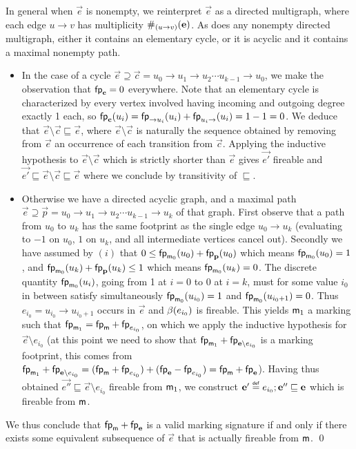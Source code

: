 \begin{proofE}
  In general when $\vec{e}$ is nonempty, we reinterpret $\vec{e}$ as a
  directed multigraph, where each edge $u \to v$ has multiplicity
  $\#_{(u \to v)}(\mathbf{e})$.  As does any nonempty directed
  multigraph, either it contains an elementary cycle, or it is acyclic and it
  contains a maximal nonempty path.
  \begin{itemize}
    \item In the case of a cycle $\vec{e} \supseteq \vec{c} = u_0 \to
      u_1 \to u_2 \cdots u_{k-1} \to u_0$, we make the observation
      that $\mathsf{fp}_{\mathbf{c}} = 0$ everywhere. Note that an elementary
      cycle is characterized by every vertex involved having incoming
      and outgoing degree exactly 1 each, so $\mathsf{fp}_{\mathbf{c}}(u_i) =
      \mathsf{fp}_{\to u_i}(u_i) + \mathsf{fp}_{u_i \to}(u_i) = 1 - 1 = 0$.  We
      deduce that $\vec{e} \setminus \vec{c} \sqsubseteq \vec{e}$,
      where $\vec{e} \setminus \vec{c}$ is naturally the sequence
      obtained by removing from $\vec{e}$ an occurrence of each
      transition from $\vec{c}$. Applying the inductive hypothesis to
      $\vec{e} \setminus \vec{c}$ which is strictly shorter than
      $\vec{e}$ gives $\vec{e'}$ fireable and $\vec{e'} \sqsubseteq
      \vec{e} \setminus \vec{c} \sqsubseteq \vec{e}$ where we conclude
      by transitivity of $\sqsubseteq$.
    \item Otherwise we have a directed acyclic graph,
      and a maximal path $\vec{e} \supseteq \vec{p} = u_0 \to u_1 \to u_2 \cdots u_{k-1} \to u_k$
      of that graph.
      First observe that a path from $u_0$ to $u_k$ has the same footprint
      as the single edge $u_0 \to u_k$ (evaluating to $-1$ on $u_0$, $1$ on $u_k$,
      and all intermediate vertices cancel out).
      Secondly we have assumed by $(i)$ that
      $0 \leq \mathsf{fp}_{\mathsf{m}_0}(u_0) + \mathsf{fp}_{\mathbf{p}}(u_0)$ which means $\mathsf{fp}_{\mathsf{m}_0}(u_0) = 1$,
      and $\mathsf{fp}_{\mathsf{m}_0}(u_k) + \mathsf{fp}_{\mathbf{p}}(u_k) \leq 1$ which means $\mathsf{fp}_{\mathsf{m}_0}(u_k) = 0$.
      The discrete quantity $\mathsf{fp}_{\mathsf{m}_0}(u_i)$,
      going from 1 at $i=0$ to 0 at $i=k$,
      must for some value $i_0$ in between satisfy simultaneously
      $\mathsf{fp}_{\mathsf{m}_0}(u_{i_0}) = 1$ and $\mathsf{fp}_{\mathsf{m}_0}(u_{i_0+1}) = 0$.
      Thus $e_{i_0} = u_{i_0} \to u_{i_0+1}$ occurs in $\vec{e}$ and $\beta(e_{i_0})$ is fireable.
      This yields $\mathsf{m}_1$ a marking such that $\mathsf{fp}_{\mathsf{m}_1} = \mathsf{fp}_{\mathsf{m}} + \mathsf{fp}_{e_{i_0}}$,
      on which we apply the inductive hypothesis for $\vec{e} \setminus e_{i_0}$
      (at this point we need to show that $\mathsf{fp}_{\mathsf{m}_1} + \mathsf{fp}_{\mathbf{e} \setminus e_{i_0}}$ is a marking footprint,
      this comes from $\mathsf{fp}_{\mathsf{m}_1} + \mathsf{fp}_{\mathbf{e} \setminus e_{i_0}} = (\mathsf{fp}_{\mathsf{m}} + \mathsf{fp}_{e_{i_0}}) + (\mathsf{fp}_{\mathbf{e}} - \mathsf{fp}_{e_{i_0}}) = \mathsf{fp}_{\mathsf{m}} + \mathsf{fp}_{\mathbf{e}}$).
      Having thus obtained $\vec{e''} \sqsubseteq \vec{e} \setminus e_{i_0}$
      fireable from $\mathsf{m}_1$,
      we construct $\mathbf{e'} \stackrel{\scriptscriptstyle{\mathsf{def}}}{=} e_{i_0}; \mathbf{e''} \sqsubseteq \mathbf{e}$
      which is fireable from $\mathsf{m}$.
  \end{itemize}
  We thus conclude that $\mathsf{fp}_{\mathsf{m}} + \mathsf{fp}_{\mathbf{e}}$ is a valid
  marking signature if and only if there exists some equivalent subsequence of $\vec{e}$
  that is actually fireable from $\mathsf{m}$.
  \qed
\end{proofE}
